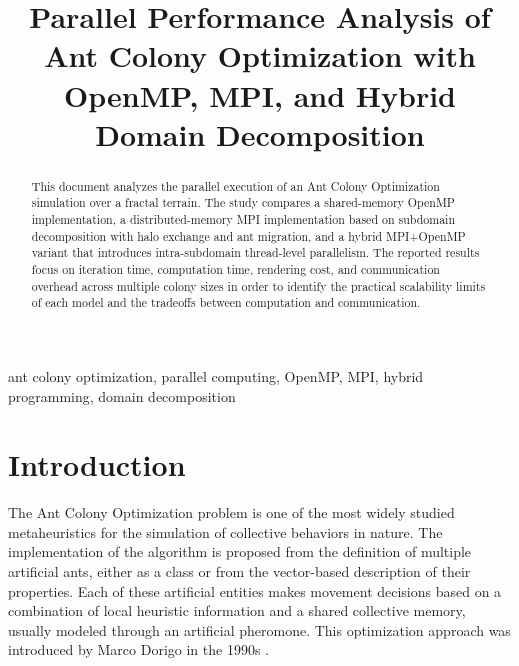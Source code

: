 \documentclass[conference]{IEEEtran}
\begin{document}
\title{Parallel Performance Analysis of Ant Colony Optimization with OpenMP, MPI, and Hybrid Domain Decomposition}

\author{
\and
{}
\and
{}

}

\maketitle

\begin{abstract}
This document analyzes the parallel execution of an Ant Colony Optimization simulation over a fractal terrain. The study compares a shared-memory OpenMP implementation, a distributed-memory MPI implementation based on subdomain decomposition with halo exchange and ant migration, and a hybrid MPI+OpenMP variant that introduces intra-subdomain thread-level parallelism. The reported results focus on iteration time, computation time, rendering cost, and communication overhead across multiple colony sizes in order to identify the practical scalability limits of each model and the tradeoffs between computation and communication.
\end{abstract}

\begin{IEEEkeywords}
ant colony optimization, parallel computing, OpenMP, MPI, hybrid programming, domain decomposition
\end{IEEEkeywords}

\section{Introduction}
The Ant Colony Optimization problem is one of the most widely studied metaheuristics for the simulation of collective behaviors in nature. The implementation of the algorithm is proposed from the definition of multiple artificial ants, either as a class or from the vector-based description of their properties. Each of these artificial entities makes movement decisions based on a combination of local heuristic information and a shared collective memory, usually modeled through an artificial pheromone. This optimization approach was introduced by Marco Dorigo in the 1990s \cite{Dorigo}.
\end{document}
